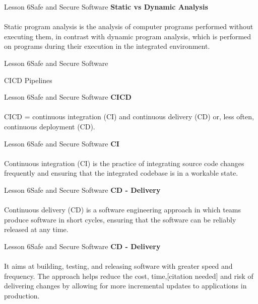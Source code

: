 \documentclass[aspectratio=1610]{beamer}
\begin{document}
\begin{frame}{Lesson 6}{Safe and Secure Software}
\LARGE
\textbf{Static vs Dynamic Analysis}\\~\\ 
Static program analysis is the analysis of computer programs performed without
executing them, in contrast with dynamic program analysis, which is performed on 
programs during their execution in the integrated environment.
\end{frame}




\begin{frame}{Lesson 6}{Safe and Secure Software}
\Huge
\begin{center}
CICD Pipelines
\end{center}
\end{frame}


\begin{frame}{Lesson 6}{Safe and Secure Software}
\LARGE
\textbf{CICD}\\~\\ 
CICD = continuous integration (CI) and continuous delivery (CD) or, less often,
continuous deployment (CD).
\end{frame}

\begin{frame}{Lesson 6}{Safe and Secure Software}
\LARGE
\textbf{CI}\\~\\ 
Continuous integration (CI) is the practice of integrating source code changes 
frequently and ensuring that the integrated codebase is in a workable state.
\end{frame}



\begin{frame}{Lesson 6}{Safe and Secure Software}
\LARGE
\textbf{CD - Delivery}\\~\\
Continuous delivery (CD) is a software engineering approach in which teams produce 
software in short cycles, ensuring that the software can be reliably released at any 
time.
\end{frame}

\begin{frame}{Lesson 6}{Safe and Secure Software}
\LARGE
\textbf{CD - Delivery}\\~\\
It aims at building, testing, and releasing software with greater speed and frequency.
The approach helps reduce the cost, time,[citation needed] and risk of delivering
changes by allowing for more incremental updates to applications in production.
\end{frame}
\end{document}
